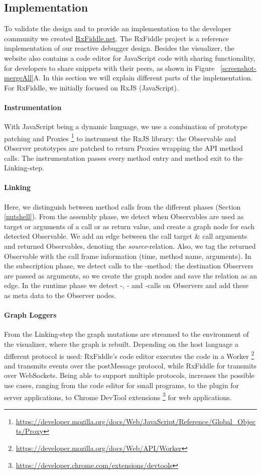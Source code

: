 \subsection{Implementation} To validate the design and to provide an
implementation to the developer community we created \url{RxFiddle.net}.
The RxFiddle project is a reference implementation of our reactive
debugger design.  Besides the visualizer, the website also contains a
code editor for JavaScript code with sharing functionality, for
developers to share snippets with their peers, as shown in Figure~%
\ref{screenshot-mergeAll}A.  In this section we will explain different
parts of the implementation.  For RxFiddle, we initially focused on RxJS
(JavaScript).

\paragraph{Instrumentation} With JavaScript being a dynamic language, we
use a combination of prototype patching and Proxies%
\footnote{\url{https://developer.mozilla.org/docs/Web/JavaScript/Reference/Global_Objects/Proxy}}
to instrument the RxJS library:  the Observable and Observer prototypes
are patched to return Proxies wrapping the API method calls.  The
instrumentation passes every method entry and method exit to the
Linking-step.

\paragraph{Linking} Here, we distinguish between method calls from the
different phases (Section~%
\ref{nutshell}).  From the assembly phase, we detect when Observables
are used as target or arguments of a call or as return value, and create
a graph node for each detected Observable.  We add an edge between the
call target \& call arguments and returned Observables, denoting the
\emph{source}-relation.  Also, we tag the returned Observable with the
call frame information (time, method name, arguments).  In the
subscription phase, we detect calls to the -method:  the
destination Observers are passed as arguments, so we create the graph
nodes and save the relation as an edge.  In the runtime phase we detect
-, - and -calls on Observers and add
these as meta data to the Observer nodes.

\paragraph{Graph Loggers} From the Linking-step the graph mutations are
streamed to the environment of the visualizer, where the graph is
rebuilt.  Depending on the host language a different protocol is used:
RxFiddle's code editor executes the code in a Worker%
\footnote{\url{https://developer.mozilla.org/docs/Web/API/Worker}} and
transmits events over the postMessage protocol, while RxFiddle for
\NodeJS{} transmits over WebSockets.  Being able to support multiple
protocols, increases the possible use cases, ranging from the code editor
for small programs, to the \NodeJS{} plugin for server applications, to
Chrome DevTool extensions%
\footnote{\url{https://developer.chrome.com/extensions/devtools}} for
web applications.

